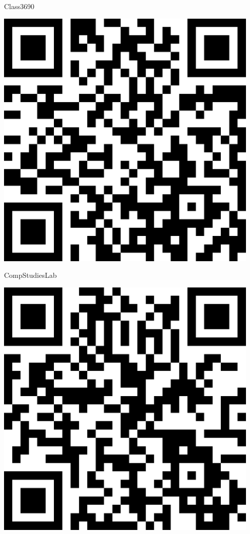 \documentclass[letterpaper]{article}
\begin{document}
 \hfill{\small Class3690} 

 \vspace{1in} 
 \pagebreak 
{} 
 \vspace*{\fill} 
 \begingroup 
 \centerline{\includegraphics[scale=1,width=5in,height=5in]{CompStudiesLab.png}} 
 \endgroup 
 \vspace*{\fill} 

 \hfill{\small CompStudiesLab} 

 \vspace{1in} 
 \pagebreak 
{} 
 \vspace*{\fill} 
 \begingroup 
 \centerline{\includegraphics[scale=1,width=5in,height=5in]{ComputerVisionLab.png}} 
 \endgroup 
 \vspace*{\fill} 
\end{document}
